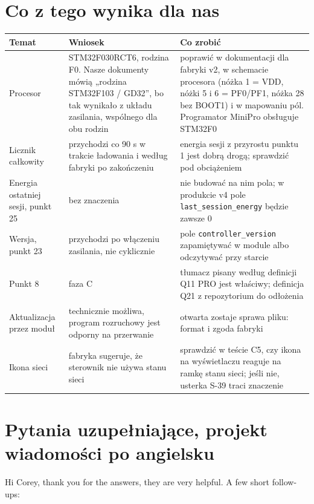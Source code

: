 \documentclass[11pt,a4paper]{article}
\begin{document}
\section{Co z tego wynika dla nas}

\begin{longtable}{>{\raggedright\arraybackslash}p{3.00cm}>{\raggedright\arraybackslash}p{5.58cm}>{\raggedright\arraybackslash}p{6.70cm}}
\toprule
\rowcolor{apteallight}\textbf{Temat} & \textbf{Wniosek} & \textbf{Co zrobić} \\
\midrule\endhead
\bottomrule\endfoot
Procesor & STM32F030RCT6, rodzina F0. Nasze dokumenty mówią „rodzina STM32F103 / GD32”, bo tak wynikało z układu zasilania, wspólnego dla obu rodzin & poprawić w dokumentacji dla fabryki v2, w schemacie procesora (nóżka 1 = VDD, nóżki 5 i 6 = PF0/PF1, nóżka 28 bez BOOT1) i w mapowaniu pól. Programator MiniPro obsługuje STM32F0 \\
Licznik całkowity & przychodzi co 90 s w trakcie ładowania i według fabryki po zakończeniu & energia sesji z przyrostu punktu 1 jest dobrą drogą; sprawdzić pod obciążeniem \\
Energia ostatniej sesji, punkt 25 & bez znaczenia & nie budować na nim pola; w produkcie v4 pole \texttt{last\_\allowbreak{}session\_\allowbreak{}energy} będzie zawsze 0 \\
Wersja, punkt 23 & przychodzi po włączeniu zasilania, nie cyklicznie & pole \texttt{controller\_\allowbreak{}version} zapamiętywać w module albo odczytywać przy starcie \\
Punkt 8 & faza C & tłumacz pisany według definicji Q11 PRO jest właściwy; definicja Q21 z repozytorium do odłożenia \\
Aktualizacja przez moduł & technicznie możliwa, program rozruchowy jest odporny na przerwanie & otwarta zostaje sprawa pliku: format i zgoda fabryki \\
Ikona sieci & fabryka sugeruje, że sterownik nie używa stanu sieci & sprawdzić w teście C5, czy ikona na wyświetlaczu reaguje na ramkę stanu sieci; jeśli nie, usterka S-39 traci znaczenie \\
\end{longtable}

\section{Pytania uzupełniające, projekt wiadomości po angielsku}

Hi Corey, thank you for the answers, they are very helpful. A few short follow-ups:
\end{document}
